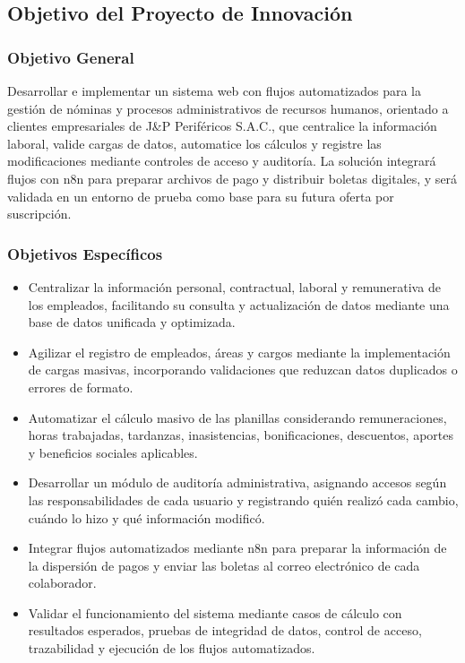 \subsection{Objetivo del Proyecto de Innovación}

\subsubsection{Objetivo General}
Desarrollar e implementar un sistema web con flujos automatizados para la gestión de nóminas y procesos administrativos de recursos humanos, orientado a clientes empresariales de J\&P Periféricos S.A.C.,
 que centralice la información laboral, valide cargas de datos, automatice los cálculos y registre las modificaciones mediante controles de acceso y auditoría. 
 La solución integrará flujos con n8n para preparar archivos de pago y distribuir boletas digitales,
y será validada en un entorno de prueba como base para su futura oferta por suscripción.
\subsubsection{Objetivos Específicos}
\begin{itemize}[leftmargin=*]
    \item Centralizar la información personal, contractual, laboral y remunerativa de los empleados, facilitando su consulta y actualización de datos mediante una base de datos unificada y optimizada.
    
    \item Agilizar el registro de empleados, áreas y cargos mediante la implementación de cargas masivas, incorporando validaciones que reduzcan datos duplicados o errores de formato.
    
    \item Automatizar el cálculo masivo de las planillas considerando remuneraciones, horas trabajadas, tardanzas, inasistencias, bonificaciones, descuentos, aportes y beneficios sociales aplicables.
    
    \item Desarrollar un módulo de auditoría administrativa, asignando accesos según las responsabilidades de cada usuario y registrando quién realizó cada cambio, cuándo lo hizo y qué información modificó.
    
    \item Integrar flujos automatizados mediante n8n para preparar la información de la dispersión de pagos y enviar las boletas al correo electrónico de cada colaborador.

    \item Validar el funcionamiento del sistema mediante casos de cálculo con resultados esperados, pruebas de integridad de datos, control de acceso, trazabilidad y ejecución de los flujos automatizados.
\end{itemize}